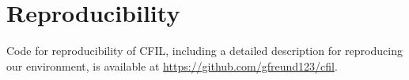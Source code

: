 
\section{Reproducibility}

Code for reproducibility of CFIL, including a detailed description for reproducing our environment, is available at \url{https://github.com/gfreund123/cfil}.
